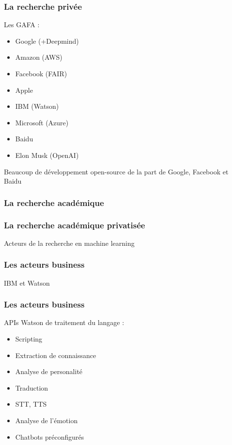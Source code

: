 \begin{frame}
  \frametitle{La recherche privée}
  Les GAFA :
  \begin{itemize}
  \item Google (+Deepmind)
  \item Amazon (AWS)
  \item Facebook (FAIR)
  \item Apple 
  \item IBM (Watson)
  \item Microsoft (Azure)
  \item Baidu
  \item Elon Musk (OpenAI)
  \end{itemize}
  Beaucoup de développement open-source de la part de Google, Facebook et Baidu
\end{frame}

\begin{frame}
  \frametitle{La recherche académique}
\end{frame}

\begin{frame}
  \frametitle{La recherche académique privatisée}
  Acteurs de la recherche en machine learning
\end{frame}

\begin{frame}
  \frametitle{Les acteurs business}
  IBM et Watson
\end{frame}

\begin{frame}
  \frametitle{Les acteurs business}
  APIs Watson de traitement du langage : \\
  \begin{minipage}[c]{0.49\linewidth}
    \begin{itemize}
    \item Scripting
    \item Extraction de connaissance
    \item Analyse de personalité
    \item Traduction
    \end{itemize}
  \end{minipage}\hfill
  \begin{minipage}[c]{0.50\linewidth}
    \begin{itemize}
    \item STT, TTS
    \item Analyse de l'émotion
    \item Chatbots préconfigurés
    \end{itemize}
  \end{minipage}\hfill
\end{frame}

